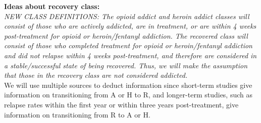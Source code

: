 \documentclass[12pt]{article}
\begin{document}
\noindent \textbf{Ideas about recovery class:} \\ 

\textit{NEW CLASS DEFINITIONS: The opioid addict and heroin addict classes will consist of those who are actively addicted, are in treatment, or are within 4 weeks post-treatment for opioid or heroin/fentanyl addiction. The recovered class will consist of those who completed treatment for opioid or heroin/fentanyl addiction and did not relapse within 4 weeks post-treatment, and therefore are considered in a stable/successful state of being recovered. Thus, we will make the assumption that those in the recovery class are not considered addicted.}\\

We will use multiple sources to deduct information since short-term studies give information on transitioning from A or H to R, and longer-term studies, such as relapse rates within the first year or within three years post-treatment, give information on transitioning from R to A or H. \\
\end{document}
